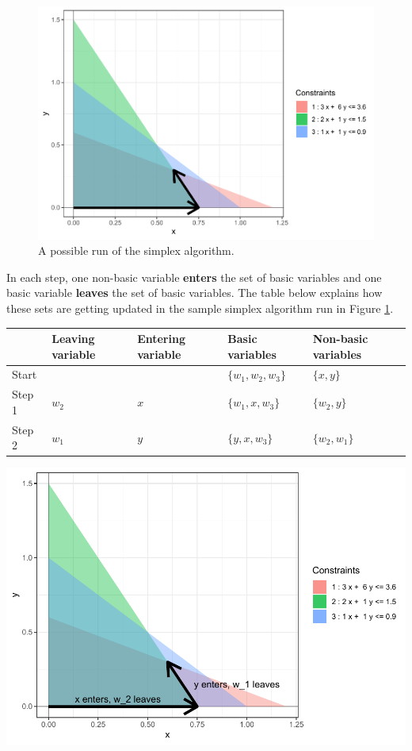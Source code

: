 \documentclass[
]{book}
\theoremstyle{definition}
\theoremstyle{definition}
\theoremstyle{definition}
\theoremstyle{definition}
\theoremstyle{remark}
\begin{document}
\begin{figure}
\centering
\includegraphics{Introduction-to-Optimization_files/figure-latex/sample-run-1.pdf}
\caption{\label{fig:sample-run}A possible run of the simplex algorithm.}
\end{figure}

In each step, one non-basic variable \textbf{enters} the set of basic variables and one basic variable \textbf{leaves} the set of basic variables. The table below explains how these sets are getting updated in the sample simplex algorithm run in Figure \ref{fig:sample-run}.

\begin{longtable}[]{@{}lllll@{}}
\toprule
& Leaving variable & Entering variable & Basic variables & Non-basic variables \\
\midrule
\endhead
Start & & & \(\{w_1, w_2, w_3\}\) & \(\{x, y\}\) \\
Step 1 & \(w_2\) & \(x\) & \(\{w_1, x, w_3\}\) & \(\{w_2, y\}\) \\
Step 2 & \(w_1\) & \(y\) & \(\{y, x, w_3\}\) & \(\{w_2, w_1\}\) \\
\bottomrule
\end{longtable}

\includegraphics{Introduction-to-Optimization_files/figure-latex/fig-bond-portfolio-entering-1.pdf}
\end{document}

